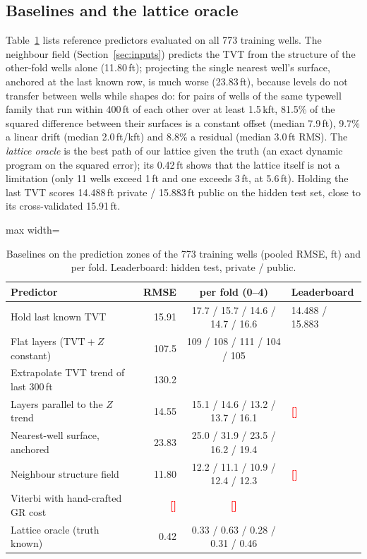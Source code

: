\documentclass[preprint,12pt,authoryear]{elsarticle}
\newcommand{\PH}[1]{\textcolor{red}{\textbf{[#1]}}}
\newcommand{\TVT}{\mathrm{TVT}}
\begin{document}
\subsection{Baselines and the lattice oracle}\label{sec:baselines}
Table~\ref{tab:baselines} lists reference predictors evaluated on all 773 training wells. The neighbour field (Section~\ref{sec:inputs}) predicts the TVT from the structure of the other-fold wells alone (11.80\,ft); projecting the single nearest well's surface, anchored at the last known row, is much worse (23.83\,ft), because levels do not transfer between wells while shapes do: for pairs of wells of the same typewell family that run within 400\,ft of each other over at least 1.5\,kft, 81.5\% of the squared difference between their surfaces is a constant offset (median 7.9\,ft), 9.7\% a linear drift (median 2.0\,ft/kft) and 8.8\% a residual (median 3.0\,ft RMS). The \emph{lattice oracle} is the best path of our lattice given the truth (an exact dynamic program on the squared error); its 0.42\,ft shows that the lattice itself is not a limitation (only 11 wells exceed 1\,ft and one exceeds 3\,ft, at 5.6\,ft). Holding the last TVT scores 14.488\,ft private / 15.883\,ft public on the hidden test set, close to its cross-validated 15.91\,ft.

\begin{table}[!htbp]\centering\small
\caption{Baselines on the prediction zones of the 773 training wells (pooled RMSE, ft) and per fold. Leaderboard: hidden test, private / public.}\label{tab:baselines}
\begin{adjustbox}{max width=\linewidth}
\begin{tabular}{lrcl}
\toprule
Predictor & RMSE & per fold (0--4) & Leaderboard \\
\midrule
Hold last known TVT & 15.91 & 17.7 / 15.7 / 14.6 / 14.7 / 16.6 & 14.488 / 15.883 \\
Flat layers ($\TVT+Z$ constant) & 107.5 & 109 / 108 / 111 / 104 / 105 & \\
Extrapolate TVT trend of last 300\,ft & 130.2 & & \\
Layers parallel to the $Z$ trend & 14.55 & 15.1 / 14.6 / 13.2 / 13.7 / 16.1 & \PH{} \\
Nearest-well surface, anchored & 23.83 & 25.0 / 31.9 / 23.5 / 16.2 / 19.4 & \\
Neighbour structure field & 11.80 & 12.2 / 11.1 / 10.9 / 12.4 / 12.3 & \PH{} \\
Viterbi with hand-crafted GR cost & \PH{} & \PH{} & \\
\midrule
Lattice oracle (truth known) & 0.42 & 0.33 / 0.63 / 0.28 / 0.31 / 0.46 & \\
\bottomrule
\end{tabular}
\end{adjustbox}
\end{table}
\end{document}
